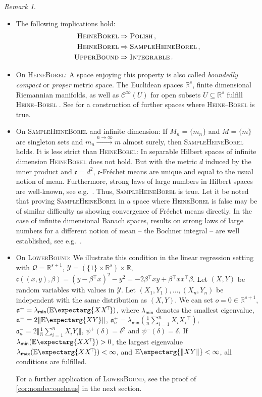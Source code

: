 \documentclass{scrartcl}
\renewcommand{\subset}{\subseteq}
\newcommand{\Ex}{\E\expectarg}
\newcommand*{\mc}[1]{\mathcal{#1}}
\newcommand*{\ms}[1]{\mathsf{#1}}
\newcommand*{\mf}[1]{\mathfrak{#1}}
\newcommand{\R}{\mathbb{R}}
\newcommand{\transpose}{\!^\top\!}
\newcommand{\tr}{\transpose}
\newcommand{\normof}[1]{\Vert #1 \Vert}
\newcommand{\equationFullstop}{\, .}
\newcommand{\eqfs}{\equationFullstop}
\newcommand{\equationComma}{\, ,}
\newcommand{\eqcm}{\equationComma}
\theoremstyle{plain}\newtheorem{theorem}{Theorem}[section]
\theoremstyle{definition}
\theoremstyle{remark}
\newtheorem{remark}[theorem]{Remark}
\begin{document}
\begin{remark}\label{rem:on_ass1}\mbox{ }
\begin{itemize}
\item 
	The following implications hold:
	\begin{align*}
	\textsc{HeineBorel} &\Rightarrow \textsc{Polish}\eqcm\\
	\textsc{HeineBorel} &\Rightarrow \textsc{SampleHeineBorel}\eqcm\\
	\textsc{UpperBound} &\Rightarrow \textsc{Integrable}\eqfs
	\end{align*}
\item On \textsc{HeineBorel}:
	A space enjoying this property is also called \textit{boundedly compact} or \textit{proper} metric space.
	The Euclidean spaces $\R^s$, finite dimensional Riemannian manifolds, as well as $\mc C^\infty(U)$ for open subsets $U \subset \R^s$  fulfill \textsc{Heine--Borel} \cite[section 8.4.7]{edwards95}.
	See \cite{williamson87} for a construction of further spaces where \textsc{Heine--Borel} is true. 
\item On \textsc{SampleHeineBorel} and infinite dimension:
	If $M_n=\{m_n\}$ and $M=\{m\}$ are singleton sets and $m_n \xrightarrow{n\to\infty} m$ almost surely, then \textsc{SampleHeineBorel} holds. It is less strict than \textsc{HeineBorel}: In separable Hilbert spaces of infinite dimension \textsc{HeineBorel} does not hold. But with the metric $d$ induced by the inner product and $\mf c=d^2$, $\mf c$-Fréchet means are unique and equal to the usual notion of mean. Furthermore, strong laws of large numbers in Hilbert spaces are well-known, see e.g.\ \cite{kawabe86}. Thus, \textsc{SampleHeineBorel} is true. Let it be noted that proving \textsc{SampleHeineBorel} in a space where \textsc{HeineBorel} is false may be of similar difficulty as showing convergence of Fréchet means directly. In the case of infinite dimensional Banach spaces, results on strong laws of large numbers for a different notion of mean -- the Bochner integral -- are well established, see e.g.\ \cite{hoffmann76}.
\item On \textsc{LowerBound}:
	We illustrate this condition in the linear regression setting with $\mc Q = \R^{s+1}$, $\mc Y = (\{1\}\times\R^s) \times \R$, $\mf c((x,y),\beta) = (y - \beta\tr x)^2 - y^2 = - 2 \beta\tr x y + \beta\tr xx\tr \beta$. Let $(X, Y)$ be random variables with values in $\mc Y$. Let $(X_1, Y_1),\dots, (X_n, Y_n)$ be independent with the same distribution as $(X,Y)$. We can set $o = 0\in\R^{s+1}$, $\mf a^+ = \lambda_{\ms{min}}(\Ex{XX\tr})$, where $\lambda_{\ms{min}}$ denotes the smallest eigenvalue, $\mf a^- = 2 \normof{\Ex{XY}}$, $\mf a^+_n = \lambda_{\ms{min}}(\frac1n \sum_{i=1}^n X_iX_i\tr)$, $\mf a^-_n = 2 \normof{\frac1n\sum_{i=1}^n X_iY_i}$, $\psi^+(\delta) = \delta^2$ and $\psi^-(\delta) = \delta$. If $\lambda_{\ms{min}}(\Ex{XX\tr}) > 0$, the largest eigenvalue $\lambda_{\ms{max}}(\Ex{XX\tr}) < \infty$, and $\Ex{\normof{XY}} < \infty$, all conditions are fulfilled.
	
	For a further application of \textsc{LowerBound}, see the proof of \autoref{cor:nondec:onehaus} in the next section.
\end{itemize}
\end{remark}
\end{document}
